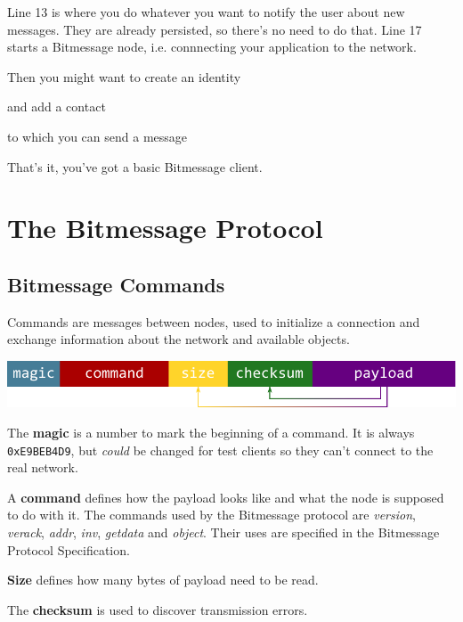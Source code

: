 \documentclass{bfh}
\begin{document}
  Line 13 is where you do whatever you want to notify the user about new messages. They are already persisted, so there's no need to do that. Line 17 starts a Bitmessage node, i.e. connnecting your application to the network.

  Then you might want to create an identity


  and add a contact


  to which you can send a message


  That's it, you've got a basic Bitmessage client.


  \newpage
  \section{The Bitmessage Protocol}

  \subsection{Bitmessage Commands}

  Commands are messages between nodes, used to initialize a connection and exchange information about the network and available objects.

  \includegraphics[width=\textwidth]{images/command.pdf}

  The \textbf{magic} is a number to mark the beginning of a command. It is always \texttt{0xE9BEB4D9}, but \textit{could} be changed for test clients so they can't connect to the real network.

  A \textbf{command} defines how the payload looks like and what the node is supposed to do with it. The commands used by the Bitmessage protocol are \textit{version}, \textit{verack}, \textit{addr}, \textit{inv}, \textit{getdata} and \textit{object}. Their uses are specified in the Bitmessage Protocol Specification.\cite{wiki:protocol}

  \textbf{Size} defines how many bytes of payload need to be read.

  The \textbf{checksum} is used to discover transmission errors.
\end{document}
